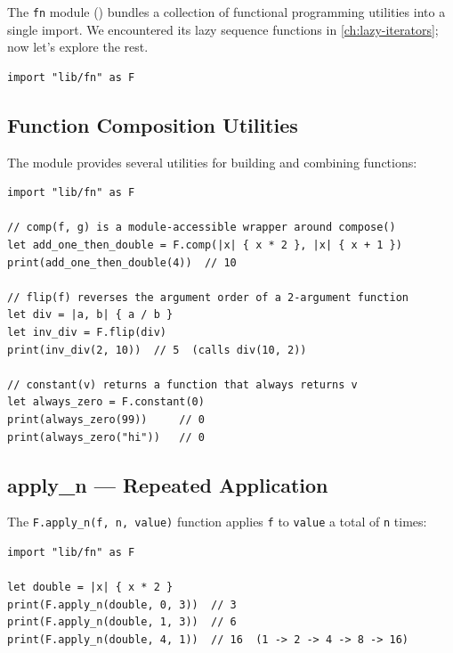 The \lstinline|fn| module () bundles a collection of functional programming utilities into a single import.
We encountered its lazy sequence functions in \cref{ch:lazy-iterators}; now let's explore the rest.

\begin{lstlisting}[language=Lattice, caption={Importing the fn module}]
import "lib/fn" as F
\end{lstlisting}

\subsection{Function Composition Utilities}\label{subsec:fn-composition}

The module provides several utilities for building and combining functions:

\begin{lstlisting}[language=Lattice, caption={comp, flip, and constant}]
import "lib/fn" as F

// comp(f, g) is a module-accessible wrapper around compose()
let add_one_then_double = F.comp(|x| { x * 2 }, |x| { x + 1 })
print(add_one_then_double(4))  // 10

// flip(f) reverses the argument order of a 2-argument function
let div = |a, b| { a / b }
let inv_div = F.flip(div)
print(inv_div(2, 10))  // 5  (calls div(10, 2))

// constant(v) returns a function that always returns v
let always_zero = F.constant(0)
print(always_zero(99))     // 0
print(always_zero("hi"))   // 0
\end{lstlisting}

\subsection{apply\_n --- Repeated Application}\label{subsec:fn-apply-n}

The \lstinline|F.apply_n(f, n, value)| function applies \lstinline|f| to \lstinline|value| a total of \lstinline|n| times:

\begin{lstlisting}[language=Lattice, caption={Repeated function application}]
import "lib/fn" as F

let double = |x| { x * 2 }
print(F.apply_n(double, 0, 3))  // 3
print(F.apply_n(double, 1, 3))  // 6
print(F.apply_n(double, 4, 1))  // 16  (1 -> 2 -> 4 -> 8 -> 16)
\end{lstlisting}

